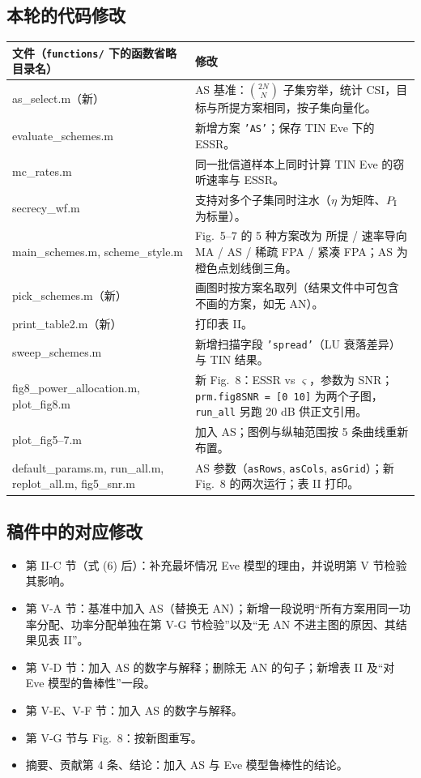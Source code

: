 \documentclass[11pt,a4paper]{ctexart}
\newcommand{\code}[1]{\texttt{#1}}
\begin{document}
\subsection{本轮的代码修改}
\begin{longtable}{>{\ttfamily\small}p{4.6cm}p{11.0cm}}
\toprule
文件（\code{functions/} 下的函数省略目录名） & 修改 \\ \midrule
as\_select.m（新） & AS 基准：$\binom{2N}{N}$ 子集穷举，统计 CSI，目标与所提方案相同，按子集向量化。\\
evaluate\_schemes.m & 新增方案 \code{'AS'}；保存 TIN Eve 下的 ESSR。\\
mc\_rates.m & 同一批信道样本上同时计算 TIN Eve 的窃听速率与 ESSR。\\
secrecy\_wf.m & 支持对多个子集同时注水（$\eta$ 为矩阵、$P_{\rm I}$ 为标量）。\\
main\_schemes.m, scheme\_style.m & Fig.~5--7 的 5 种方案改为 所提 / 速率导向 MA / AS / 稀疏 FPA / 紧凑 FPA；AS 为橙色点划线倒三角。\\
pick\_schemes.m（新） & 画图时按方案名取列（结果文件中可包含不画的方案，如无 AN）。\\
print\_table2.m（新） & 打印表 II。\\
sweep\_schemes.m & 新增扫描字段 \code{'spread'}（LU 衰落差异）与 TIN 结果。\\
fig8\_power\_allocation.m, plot\_fig8.m & 新 Fig.~8：ESSR vs $\varsigma$，参数为 SNR；\code{prm.fig8SNR = [0 10]} 为两个子图，\code{run\_all} 另跑 20 dB 供正文引用。\\
plot\_fig5--7.m & 加入 AS；图例与纵轴范围按 5 条曲线重新布置。\\
default\_params.m, run\_all.m, replot\_all.m, fig5\_snr.m & AS 参数（\code{asRows}, \code{asCols}, \code{asGrid}）；新 Fig.~8 的两次运行；表 II 打印。\\
\bottomrule
\end{longtable}

\subsection{稿件中的对应修改}
\begin{itemize}
\item 第 II-C 节（式 (6) 后）：补充最坏情况 Eve 模型的理由，并说明第 V 节检验其影响。
\item 第 V-A 节：基准中加入 AS（替换无 AN）；新增一段说明“所有方案用同一功率分配、功率分配单独在第 V-G 节检验”以及“无 AN 不进主图的原因、其结果见表 II”。
\item 第 V-D 节：加入 AS 的数字与解释；删除无 AN 的句子；新增表 II 及“对 Eve 模型的鲁棒性”一段。
\item 第 V-E、V-F 节：加入 AS 的数字与解释。
\item 第 V-G 节与 Fig.~8：按新图重写。
\item 摘要、贡献第 4 条、结论：加入 AS 与 Eve 模型鲁棒性的结论。
\end{itemize}
\end{document}
